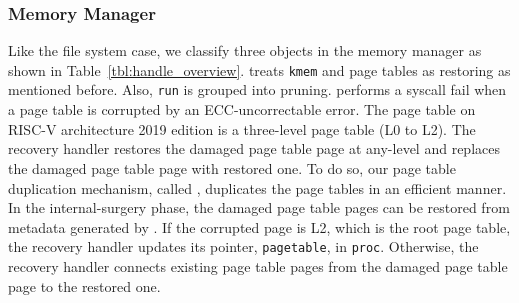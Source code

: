 \subsubsection{Memory Manager}
\label{subsec:recoveryhandlerMA}
Like the file system case, we classify three objects in the memory manager as shown in Table~\ref{tbl:handle_overview}. {\sysname} treats \texttt{kmem} and page tables as restoring as mentioned before. Also, \texttt{run} is grouped into pruning. {\sysname} performs a syscall fail when a page table is corrupted by an ECC-uncorrectable error. The page table on RISC-V architecture 2019 edition is a three-level page table (L0 to L2). The recovery handler restores the damaged page table page at any-level and replaces the damaged page table page with restored one. To do so, our page table duplication mechanism, called {\ptdup}, duplicates the page tables in an efficient manner. In the internal-surgery phase, the damaged page table pages can be restored from metadata generated by {\ptdup}. If the corrupted page is L2, which is the root page table, the recovery handler updates its pointer, \texttt{pagetable}, in \texttt{proc}. Otherwise, the recovery handler connects existing page table pages from the damaged page table page to the restored one.
